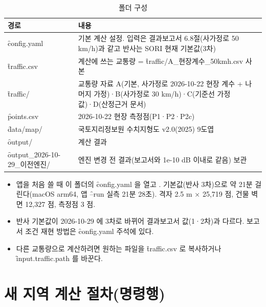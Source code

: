 \documentclass[10.5pt,a4paper]{article}
\begin{document}
\begin{table}[h]\centering\small
\caption{폴더 구성}\label{tab:jn}
\begin{tabularx}{\textwidth}{P{40mm}L}
\toprule
경로 & 내용 \\ \midrule
\f{config.yaml} & 기본 계산 설정. 입력은 결과보고서 6.8절(사가정로 50 km/h)과 같고 반사는 SORI 현재 기본값(3차) \\
\f{traffic.csv} & 계산에 쓰는 교통량 = \f{traffic/A\_현장계수\_50kmh.csv} 사본 \\
\f{traffic/} & 교통량 자료 A(기본, 사가정로 2026-10-22 현장 계수 + 나머지 가정)·B(사가정로 30 km/h)·C(기준선 가정값)·D(산정근거 문서) \\
\f{points.csv} & 2026-10-22 현장 측정점(P1·P2·P2c) \\
\f{data/map/} & 국토지리정보원 수치지형도 v2.0(2025) 9도엽 \\
\f{output/} & 계산 결과 \\
\f{output\_2026-10-29\_이전엔진/} & 엔진 변경 전 결과(보고서와 1e-10 dB 이내로 같음) 보관 \\
\bottomrule
\end{tabularx}
\end{table}

\begin{itemize}
\item 앱을 처음 쓸 때 이 폴더의 \f{config.yaml} 을 열고 . 기본값(반사 3차)으로 약 21분 걸린다(macOS arm64, 앱 \f{--run} 실측 21분 28초). 격자 2.5 m × 25,719 점, 건물 벽면 12,327 점, 측정점 3 점.
\item 반사 기본값이 2026-10-29 에 3차로 바뀌어 결과보고서 값(1·2차)과 다르다. 보고서 조건 재현 방법은 \f{config.yaml} 주석에 있다.
\item 다른 교통량으로 계산하려면 원하는 파일을 \f{traffic.csv} 로 복사하거나 \f{input.traffic.path} 를 바꾼다.
\end{itemize}

\section{새 지역 계산 절차(명령행)}
\end{document}
